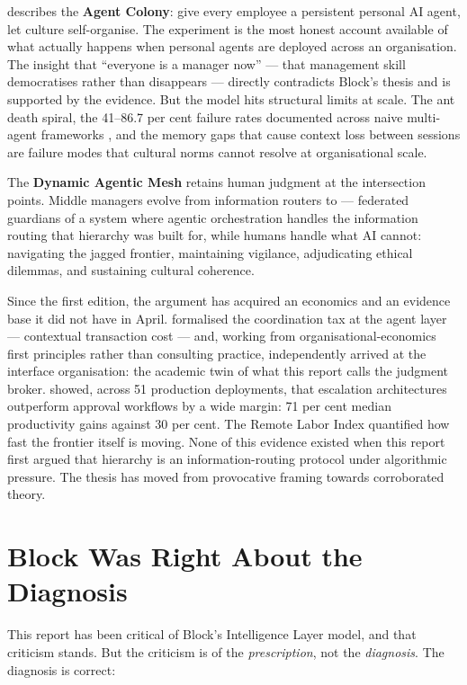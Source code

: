 \textcite{Shipper2026} describes the \textbf{Agent Colony}: give every employee a persistent personal AI agent, let culture self-organise. The experiment is the most honest account available of what actually happens when personal agents are deployed across an organisation. The insight that ``everyone is a manager now'' --- that management skill democratises rather than disappears --- directly contradicts Block's thesis and is supported by the evidence. But the model hits structural limits at scale. The ant death spiral, the 41--86.7 per cent failure rates documented across naive multi-agent frameworks \parencite{Cemri2025}, and the memory gaps that cause context loss between sessions are failure modes that cultural norms cannot resolve at organisational scale.

The \textbf{Dynamic Agentic Mesh} retains human judgment at the intersection points. Middle managers evolve from information routers to  --- federated guardians of a system where agentic orchestration handles the information routing that hierarchy was built for, while humans handle what AI cannot: navigating the jagged frontier, maintaining vigilance, adjudicating ethical dilemmas, and sustaining cultural coherence.

Since the first edition, the argument has acquired an economics and an evidence base it did not have in April. \textcite{Liu2026} formalised the coordination tax at the agent layer --- contextual transaction cost --- and, working from organisational-economics first principles rather than consulting practice, independently arrived at the interface organisation: the academic twin of what this report calls the judgment broker. \textcite{Pereira2026Playbook} showed, across 51 production deployments, that escalation architectures outperform approval workflows by a wide margin: 71 per cent median productivity gains against 30 per cent. The Remote Labor Index \parencite{CAIS2026RLI} quantified how fast the frontier itself is moving. None of this evidence existed when this report first argued that hierarchy is an information-routing protocol under algorithmic pressure. The thesis has moved from provocative framing towards corroborated theory.

\section{Block Was Right About the Diagnosis}

This report has been critical of Block's Intelligence Layer model, and that criticism stands. But the criticism is of the \emph{prescription}, not the \emph{diagnosis}. The diagnosis is correct:

